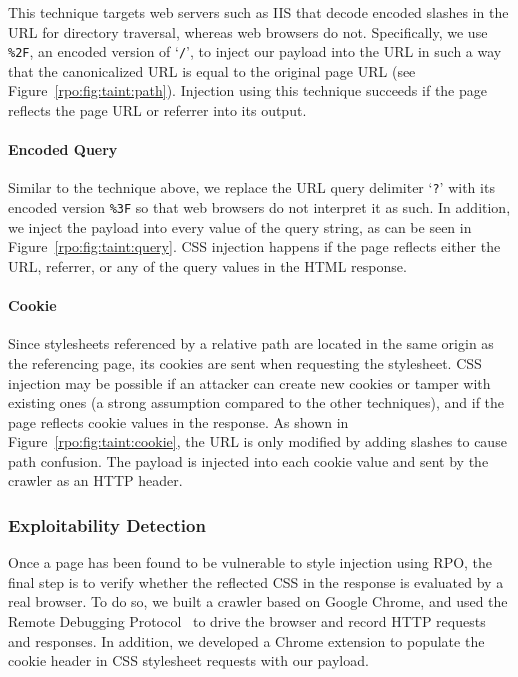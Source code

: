 This technique targets web servers such as IIS that decode encoded slashes in
the URL for directory traversal, whereas web browsers do not. Specifically, we
use \texttt{\%2F}, an encoded version of `\texttt{/}', to inject our payload
into the URL in such a way that the canonicalized URL is equal to the original
page URL (see Figure~\ref{rpo:fig:taint:path}). Injection using this technique
succeeds if the page reflects the page URL or referrer into its output.

\paragraph{Encoded Query}

Similar to the technique above, we replace the URL query delimiter `\texttt{?}'
with its encoded version \texttt{\%3F} so that web browsers do not interpret it
as such. In addition, we inject the payload into every value of the query
string, as can be seen in Figure~\ref{rpo:fig:taint:query}. CSS injection
happens if the page reflects either the URL, referrer, or any of the query
values in the HTML response.

\paragraph{Cookie}

Since stylesheets referenced by a relative path are located in the same origin
as the referencing page, its cookies are sent when requesting the stylesheet.
CSS injection may be possible if an attacker can create new cookies or tamper
with existing ones (a strong assumption compared to the other techniques), and
if the page reflects cookie values in the response. As shown in
Figure~\ref{rpo:fig:taint:cookie}, the URL is only modified by adding slashes to
cause path confusion. The payload is injected into each cookie value and sent by
the crawler as an HTTP header.

\subsubsection{Exploitability Detection}
\label{rpo:sec:methodology:exploitable}

Once a page has been found to be vulnerable to style injection using RPO, the
final step is to verify whether the reflected CSS in the response is evaluated
by a real browser. To do so, we built a crawler based on Google Chrome, and used
the Remote Debugging Protocol~\cite{debugging_protocol} to drive the browser and
record HTTP requests and responses. In addition, we developed a Chrome extension
to populate the cookie header in CSS stylesheet requests with our payload.


